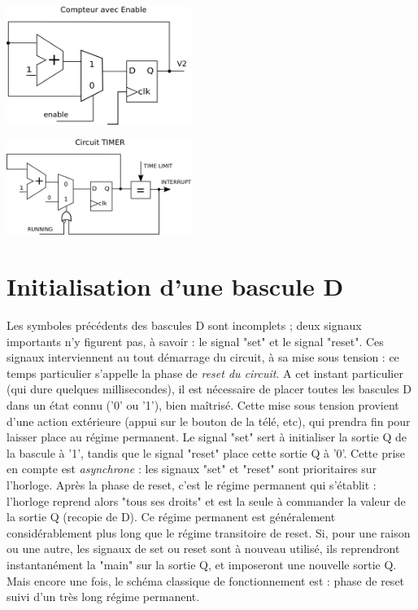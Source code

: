 \begin{center}
   \begin{minipage}[t]{8cm}
     \vspace{0pt}
     \centering
     \includegraphics[width=6cm]{./figures/compteurs.png}
   \end{minipage}

   \begin{minipage}[t]{8cm}
     \vspace{0pt}
     \centering
     \includegraphics[width=6cm]{./figures/timer.png}
   \end{minipage}

\end{center} %


\section{Initialisation d'une bascule D}
Les symboles précédents des bascules D sont incomplets ; deux signaux importants n'y figurent pas, à savoir : le signal "set" et le signal "reset".
Ces signaux interviennent au tout démarrage du circuit, à sa mise sous tension : ce temps particulier s'appelle la phase de {\it reset du circuit}.
A cet instant particulier (qui dure quelques millisecondes), il est nécessaire de placer toutes les bascules D dans un état connu ('0' ou '1'), bien maîtrisé.
Cette mise sous tension provient d'une action extérieure (appui sur le bouton de la télé, etc), qui prendra fin pour laisser place au régime permanent.
Le signal "set" sert à initialiser la sortie Q de la bascule à '1', tandis que le signal "reset" place cette sortie Q à '0'. Cette prise en compte
est {\it asynchrone} : les signaux "set" et "reset" sont prioritaires sur l'horloge. Après la phase de reset, c'est le régime permanent qui s'établit :
l'horloge reprend alors "tous ses droits" et est la seule à commander la valeur de la sortie Q (recopie de D). Ce régime permanent est généralement
considérablement plus long que le régime transitoire de reset. Si, pour une raison ou une autre, les signaux de set ou reset sont à nouveau
utilisé, ils reprendront instantanément la "main" sur la sortie Q, et imposeront une nouvelle sortie Q. Mais encore une fois, le schéma classique
de fonctionnement est : phase de reset suivi d'un très long régime permanent.

